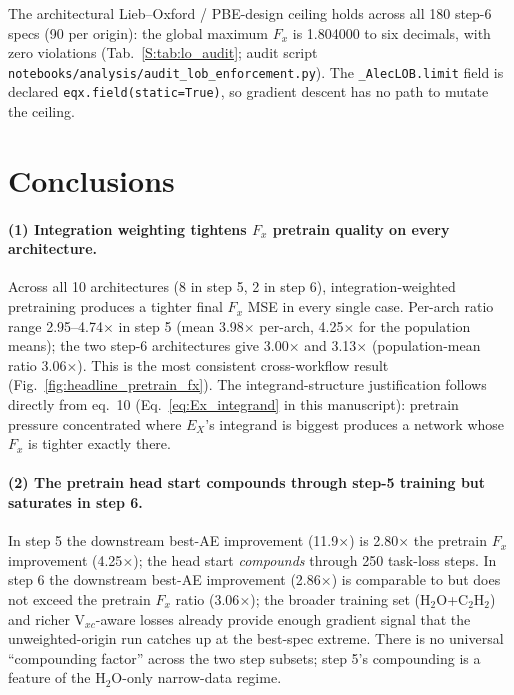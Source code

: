 \documentclass[11pt,letterpaper]{article}
\begin{document}
The architectural Lieb--Oxford / PBE-design ceiling holds across all
180 step-6 specs (90 per origin): the global maximum $F_x$ is
1.804000 to six decimals, with zero violations
(Tab.~\ref{S:tab:lo_audit}; audit script
\texttt{notebooks/analysis/audit\_lob\_enforcement.py}). The
\texttt{\_AlecLOB.limit} field is declared
\texttt{eqx.field(static=True)}, so gradient descent has no path to
mutate the ceiling.

\section{Conclusions}
\label{sec:conclusions}

\paragraph{(1) Integration weighting tightens $F_x$ pretrain quality on every architecture.}
Across all 10 architectures (8 in step 5, 2 in step 6), integration-weighted pretraining
produces a tighter final $F_x$ MSE in every single case. Per-arch ratio range
2.95--4.74$\times$ in step 5 (mean 3.98$\times$ per-arch, 4.25$\times$ for the population
means); the two step-6 architectures give 3.00$\times$ and 3.13$\times$ (population-mean
ratio 3.06$\times$). This is the most consistent cross-workflow result
(Fig.~\ref{fig:headline_pretrain_fx}). The integrand-structure justification follows directly from
\citet{PerdewBurkeErnzerhof1996} eq.~10 (Eq.~\ref{eq:Ex_integrand} in this manuscript):
pretrain pressure concentrated where $E_X$'s integrand is biggest produces a network whose
$F_x$ is tighter exactly there.

\paragraph{(2) The pretrain head start compounds through step-5 training but saturates in step 6.}
In step 5 the downstream best-AE improvement (11.9$\times$) is 2.80$\times$ the pretrain
$F_x$ improvement (4.25$\times$); the head start \emph{compounds} through 250 task-loss
steps. In step 6 the downstream best-AE improvement (2.86$\times$) is comparable to but
does not exceed the pretrain $F_x$ ratio (3.06$\times$); the broader training set
(H$_2$O+C$_2$H$_2$) and richer V$_{xc}$-aware losses already provide enough gradient signal
that the unweighted-origin run catches up at the best-spec extreme. There is no universal
``compounding factor'' across the two step subsets; step 5's compounding is a feature of
the H$_2$O-only narrow-data regime.
\end{document}
